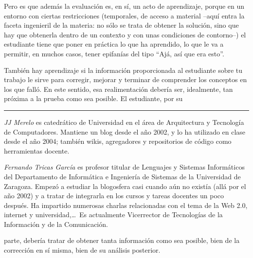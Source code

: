 \documentclass[twoside,10pt]{article}
\newcounter{num}
\begin{document}
\begin{multicols}{2}
Pero es que además la evaluación es, en sí, un acto de aprendizaje,
porque en un entorno 
con ciertas restricciones (temporales, de acceso a material --aquí entra la faceta ingenieril de la materia: no sólo se trata de obtener la solución, sino que hay que obtenerla dentro de un contexto y con unas condiciones de contorno--) el
estudiante tiene que poner en práctica lo que ha aprendido, lo que le
va a permitir, en muchos casos, tener epifanías del tipo ``Ajá, así
que era esto''.

También hay aprendizaje si la información proporcionada al estudiante sobre tu
trabajo le sirve para corregir, mejorar y terminar de comprender los conceptos
en los que falló.
En este sentido, esa realimentación debería ser, idealmente, tan próxima a la
prueba como sea posible. El estudiante, por su 

\noindent\rule{86mm}{1pt}
\vspace{1ex} {\small{\begin{window} 
\noindent\emph{JJ Merelo} es catedrático de Universidad
en el área de Arquitectura y Tecnología de Computadores.
Mantiene un blog desde el año 2002, y lo ha utilizado en clase desde
el año 2004; también wikis, agregadores y repositorios de código
como herramientas docente. 
\end{window}}}

\medskip

{\small{\begin{window}
		\noindent \emph{Fernando Tricas García} es profesor
		titular de Lenguajes y Sistemas Informáticos del Departamento
		de Informática e Ingeniería de Sistemas de la Universidad de
		Zaragoza.  Empezó a estudiar la blogosfera casi cuando aún no
		existía (allá por el año 2002) y a tratar de integrarla en los
		cursos y tareas docentes un poco después.  Ha impartido
		numerosas charlas relacionadas con el tema de la Web 2.0, 
		internet y universidad,\ldots\ 
		Es actualmente Vicerrector de Tecnologías de la Información y
de la Comunicación.   
		\end{window}}}

\noindent parte, debería tratar de obtener
tanta información como sea 
posible, bien de la corrección en sí misma, bien de
su análisis posterior.


\end{multicols}
\end{document}
